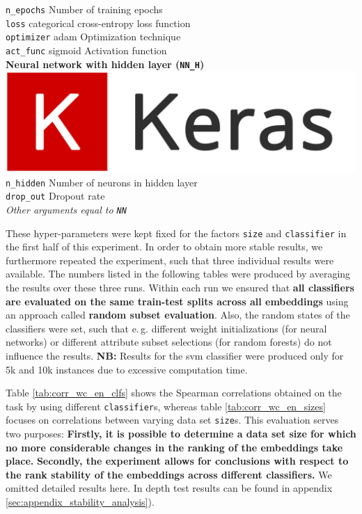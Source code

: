 \begin{tabbing}
		\>	\texttt{n\_epochs}							\>	Number of training epochs			\\[3mm]
		\>	\texttt{loss} 			\>	categorical cross-entropy	\>	loss function							\\[3mm]
		\> 	\texttt{optimizer}		\> 	adam					\>	Optimization technique			\\[3mm]
		\> 	\texttt{act\_func} 	\>	sigmoid					\>	Activation function				\\[4mm]
	 \textbf{Neural network with hidden layer (\texttt{NN\_H})}
		\>	\>	\> 	\includegraphics[scale=0.025]{images/keras}									\\[3mm]
		\> 	\texttt{n\_hidden}							\>	Number of neurons in hidden layer	\\[3mm]
		\> 	\texttt{drop\_out}						\>	Dropout rate					\\[3mm]
		\> 	\textit{Other arguments equal to \texttt{NN}}\>		\>									\\
\end{tabbing}

These hyper-parameters were kept fixed for the factors \texttt{size} and \texttt{classifier} in the first half of this experiment. In order to obtain more stable results, we furthermore repeated the experiment, such that three individual results were available. The numbers listed in the following tables were produced by averaging the results over these three runs. Within each run we ensured that \textbf{all classifiers are evaluated on the same train-test splits across all embeddings} using an approach called \textbf{random subset evaluation}. Also, the random states of the classifiers were set, such that e.\,g. different weight initializations (for neural networks) or different attribute subset selections (for random forests) do not influence the results. \textbf{NB:} Results for the \gls{svm} classifier were produced only for 5k and 10k instances due to excessive computation time.

Table \vref{tab:corr_wc_en_clfs} shows the Spearman correlations obtained on the  task by using different \texttt{classifier}s, whereas table \vref{tab:corr_wc_en_sizes} focuses on correlations between varying data set \texttt{size}s. This evaluation serves two purposes:  \textbf{Firstly, it is possible to determine a data set size for which no more considerable changes in the ranking of the embeddings take place.}  \textbf{Secondly, the experiment allows for conclusions with respect to the rank stability of the embeddings across different classifiers.} We omitted detailed results here. In depth test results can be found in appendix \vref{sec:appendix_stability_analysis}).

